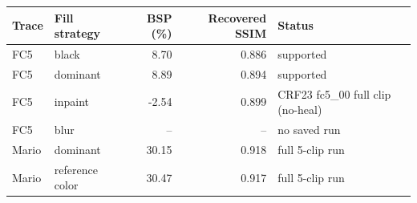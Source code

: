\begin{tabular}{@{}llrrl@{}}
\toprule
\textbf{Trace} & \textbf{Fill strategy} & \textbf{BSP} (\%) & \textbf{Recovered SSIM} & \textbf{Status} \\
\midrule
FC5 & black & 8.70 & 0.886 & supported \\
FC5 & dominant & 8.89 & 0.894 & supported \\
FC5 & inpaint & -2.54 & 0.899 & CRF23 fc5\_00 full clip (no-heal) \\
FC5 & blur & -- & -- & no saved run \\
Mario & dominant & 30.15 & 0.918 & full 5-clip run \\
Mario & reference color & 30.47 & 0.917 & full 5-clip run \\
\bottomrule
\end{tabular}
